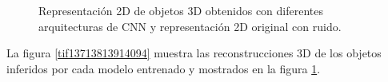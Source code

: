 \documentclass[10pt,letterpaper]{article}
\begin{document}
\begin{figure}[H]
\begin{center}
{            \label{tif89}}
        \caption{Representación 2D de objetos 3D obtenidos con diferentes arquitecturas de CNN y representación 2D original con ruido.}
        \label{tif13313413513689}
      \end{center}
\end{figure}

La figura \ref{tif13713813914094} muestra las reconstrucciones 3D de los objetos inferidos por cada modelo entrenado y mostrados en la figura \ref{tif13313413513689}.

\begin{figure}[H]
      \begin{center}
\end{center}
\end{figure}
\end{document}
